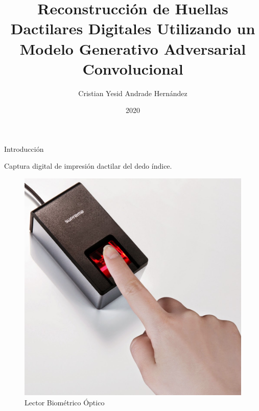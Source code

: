 \documentclass[12pt,aspectratio=169]{beamer}
\title{Reconstrucción de Huellas Dactilares Digitales Utilizando un Modelo Generativo Adversarial Convolucional}
\author{Cristian Yesid Andrade Hernández}
\institute{Universidad de los Andes}
\date{2020}
\begin{document}
\frame[plain]{\titlepage}

\begin{frame}{Introducción}

    Captura digital de impresión dactilar del dedo índice.

    \begin{figure}[h]
        \includegraphics[scale=0.15]{figs/dedo_lector_biometrico.jpg}
        \caption{Lector Biométrico Óptico}
    \end{figure}
    
\end{frame}
\end{document}
